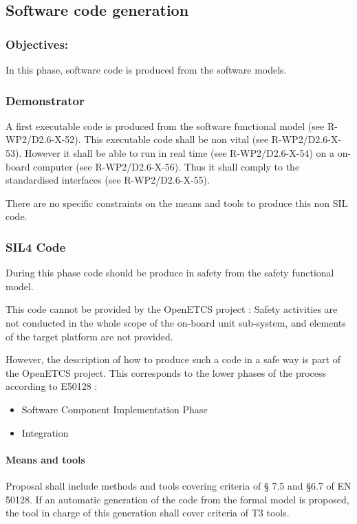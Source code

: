 \subsection{Software code generation}
\label{sec:sw-code}



\subsubsection{Objectives:}
\label{sec:sw-req-objective}


In this phase, software code is produced from the software models.

\subsubsection{Demonstrator}
\label{sec:demo-phase}

A first executable code is produced from the software functional model (see R-WP2/D2.6-X-52). This executable code shall be non vital (see R-WP2/D2.6-X-53). However it shall be able to run in real time (see R-WP2/D2.6-X-54) on a on-board computer (see R-WP2/D2.6-X-56).
Thus it shall comply to the standardised interfaces (see R-WP2/D2.6-X-55). 

There are no specific constraints on the means and tools to  produce this non SIL code.


\subsubsection{SIL4 Code}
\label{sec:code-phase}

During this phase code should be produce in safety from the safety functional model.

This code cannot be provided by the OpenETCS project : Safety  activities are not conducted in the whole scope of the on-board unit sub-system, and elements of the target platform are not provided.

However, the description of how to  produce such a code in a safe way is part of the OpenETCS project. This corresponds to the lower phases of the process according to  E50128 :
\begin{itemize}
\item Software Component Implementation Phase
\item Integration
\end{itemize}


\paragraph{Means and tools}
\label{sec:code-means}

Proposal shall include methods and tools covering criteria of § 7.5 and §6.7 of EN 50128.
If an automatic generation of the code from the formal model is proposed, the tool in charge of this generation shall cover criteria of T3 tools.





